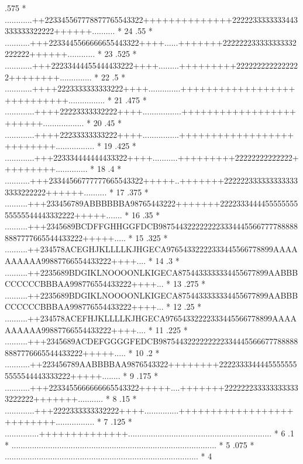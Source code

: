\begin{Listing}
      .575  *       ............++223345567778877765543322++++++++++++++2222233333333443333333322222++++++..........   *  24
      .55   *        ...........+++2233445566666655443322++++......+++++++222222233333333332222222++++++............   *  23
      .525  *        ............+++22233444455444433222++++.........+++++++++2222222222222222++++++++..............   *  22
      .5    *         ............++++2223333333333222++++..............++++++++++++++++++++++++++++................   *  21
      .475  *         .............++++22223333332222++++.................++++++++++++++++++++++++..................   *  20
      .45   *         .............++++22233333333222++++................++++++++++++++++++++++++++.................   *  19
      .425  *        .............+++223334444444433322++++...........+++++++++22222222222222+++++++++..............   *  18
      .4    *        ...........+++23344566777777665543322+++++..+++++++2222223333333333333333222222++++++..........   *  17
      .375  *       ..........+++233456789ABBBBBBA98765443222+++++++222233344445555555555555544443332222+++++.......   *  16
      .35   *      ..........+++2345689BCDFFGHHGGFDCB98754432222222233344455667777888888887777665544433222+++++.....   *  15
      .325  *      ..........++234578ACEGHJKLLLLKJHGECA97654332222333445566778899AAAAAAAAAA99887766554433222++++....   *  14
      .3    *     ..........++2235689BDGIKLNOOOONLKIGECA8754433333334455677899AABBBCCCCCCBBBAA998776554433222++++...   *  13
      .275  *     ..........++2235689BDGIKLNOOOONLKIGECA8754433333334455677899AABBBCCCCCCBBBAA998776554433222++++...   *  12
      .25   *      ..........++234578ACEFHJKLLLLKJHGECA97654332222333445566778899AAAAAAAAAA99887766554433222++++....   *  11
      .225  *      ..........+++2345689ACDEFGGGGFEDCB98754432222222223344455666777888888887776665544433222+++++.....   *  10
      .2    *       ...........++223456789AABBBBAA9876543322++++++++22223333444455555555555544443333222+++++........   *   9
      .175  *        ...........+++2233455666666665543322+++++....+++++++2222222333333333333222222+++++++...........   *   8
      .15   *         .............+++2222333333332222++++...............++++++++++++++++++++++++++.................   *   7
      .125  *           ...............++++++++++++++...............................................................   *   6
      .1    *             ..........................................................................................   *   5
      .075  *               .....................................................................................      *   4

\end{Listing}
